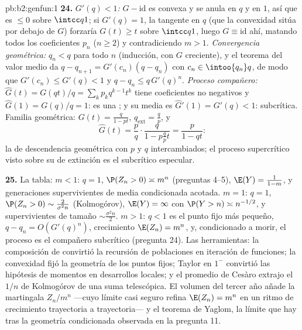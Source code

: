 \begin{solution}{pb:b2:genfun:1}
\textbf{24.} \emph{$G'(q) < 1$:} $G - \mathrm{id}$ es convexa y se
anula en $q$ y en $1$, así que es $\leq 0$ sobre $\intcc q1$; si
$G'(q) = 1$, la tangente en $q$ (que la convexidad sitúa por debajo
de $G$) forzaría $G(t) \geq t$ sobre $\intcc q1$, luego $G \equiv
\mathrm{id}$ ahí, matando todos los coeficientes $p_n$ ($n \geq 2$) y
contradiciendo $m > 1$. \emph{Convergencia geométrica:} $q_n < q$
para todo $n$ (inducción, con $G$ creciente), y el teorema del valor
medio da $q - q_{n+1} = G'(c_n)(q - q_n)$ con $c_n \in \intoo{q_n}q$,
de modo que $G'(c_n) \leq G'(q) < 1$ y $q - q_n \leq q\,G'(q)^n$.
\emph{Proceso compañero:} $\widehat G(t) = G(qt)/q =
\sum_kp_kq^{k-1}t^k$ tiene coeficientes no negativos y $\widehat G(1)
= G(q)/q = 1$: es una ; y su media es $\widehat
G'(1) = G'(q) < 1$: subcrítica. Familia geométrica: $G(t) =
\frac{q}{1-pt}$, $q_{\mathrm{ext}} = \frac qp$, y
\[
\widehat G(t) = \frac pq\cdot\frac{q}{1 - p\frac qp t}
= \frac{p}{1 - qt} :
\]
la  de descendencia geométrica con $p$ y $q$ intercambiados; el
proceso supercrítico visto sobre su  de extinción es el
subcrítico especular.

\textbf{25.} La tabla: $m < 1$: $q = 1$, $\P(Z_n > 0) \asymp m^n$
(preguntas 4--5), $\E(Y) = \frac1{1-m}$, y generaciones
supervivientes de media condicionada acotada. $m = 1$: $q = 1$,
$\P(Z_n > 0) \sim \frac2{\sigma^2n}$ (Kolmogórov), $\E(Y) = \infty$
con $\P(Y > n) \asymp n^{-1/2}$, y supervivientes de tamaño $\sim
\frac{\sigma^2n}2$. $m > 1$: $q < 1$ es el punto fijo más pequeño, $q
- q_n = O(G'(q)^n)$, crecimiento $\E(Z_n) = m^n$, y, condicionado a
morir, el proceso es el compañero subcrítico (pregunta 24). Las
herramientas: la composición de  convirtió la
recursión de poblaciones en iteración de funciones; la convexidad
fijó la geometría de los puntos fijos; Taylor en $1^-$ convirtió las
hipótesis de momentos en desarrollos locales; y el promedio de Cesàro
extrajo el $1/n$ de Kolmogórov de una suma telescópica. El volumen
del tercer año añade la martingala $Z_n/m^n$ ---cuyo límite casi
seguro refina $\E(Z_n) = m^n$ en un ritmo de crecimiento trayectoria
a trayectoria--- y el teorema de Yaglom, la  límite que hay tras
la geometría condicionada observada en la pregunta 11.
\end{solution}
